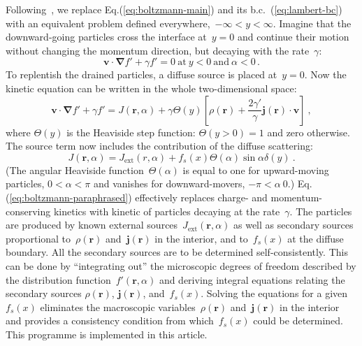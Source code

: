 \documentclass[preprint,aps,eqsecnum]{revtex4-1}
\begin{document}
Following~\cite{bib:Reuter-Sondheimer},  we replace Eq.(\ref{eq:boltzmann-main})
and its b.c.~(\ref{eq:lambert-bc}) with an equivalent
problem defined everywhere,~$-\infty < y < \infty$.
Imagine that the downward-going particles
cross the interface at~$y = 0$ and continue their motion without changing
the momentum direction, but  decaying with the rate~$\gamma$:
\begin{equation}
{\bm v}\cdot{\bm \nabla} f' + \gamma f' = 0
\ \mathrm{at}\ y < 0\  \mathrm{and}\ \alpha < 0\,.
\end{equation}
To replentish the drained particles, a diffuse source is placed
at~$y = 0$. Now the kinetic equation can be written in the whole
two-dimensional space:
\begin{equation}
  \label{eq:boltzmann-paraphrased}
  {\bm v} \cdot {\bm \nabla} f' + \gamma f' = J({\bm r}, \alpha)
  + \gamma \Theta(y)\left[\rho({\bm r}) + \frac{2\gamma'}{\gamma} {\bm j}({\bm r})\cdot{\bm v}
  \right] \ ,
\end{equation}
where $\Theta(y)$ is the Heaviside step function:
$\Theta(y>0) = 1$ and zero otherwise.
The source term now includes the contribution of the diffuse scattering:
\begin{equation}
  J({\bm r}, \alpha) = J_\mathrm{ext}(r, \alpha)
  + f_s(x)  \Theta(\alpha) \sin\alpha  \delta(y)\ .
\end{equation}
(The angular Heaviside function~$\Theta(\alpha)$ is equal to
one for upward-moving particles, $0 < \alpha < \pi$ and vanishes
for downward-movers, $-\pi < \alpha \ 0$.)
Eq.(\ref{eq:boltzmann-paraphrased}) effectively replaces charge- and
momentum-conserving kinetics with kinetic of particles decaying
at the rate~$\gamma$. The particles are produced by known external
sources~$J_\mathrm{ext}({\bm r}, \alpha)$ as well as secondary sources
proportional to~$\rho({\bm r})$ and~${\bm j}({\bm r})$ in the interior,
and to~$f_s(x)$ at the diffuse boundary. All the secondary sources are to
be determined self-consistently. This can be done by ``integrating out''
the microscopic degrees of freedom described by the distribution
function~$f'({\bm r}, \alpha)$
and deriving integral equations relating the secondary sources
$\rho({\bm r})$, ${\bm j}({\bm r})$, and~$f_s(x)$. Solving
the equations for a given~$f_s(x)$ eliminates the macroscopic
variables~$\rho({\bm r})$ and~${\bm j}({\bm r})$ in the interior
and provides a consistency condition from which~$f_s(x)$ could be determined.
This programme is implemented in this article.
\end{document}
